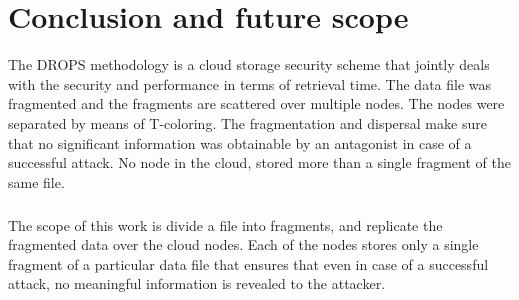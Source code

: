 
\chapter{Conclusion and future scope}

The DROPS methodology is a cloud storage security scheme that jointly deals with the security and performance in terms of retrieval time. The data file was fragmented and the fragments are scattered over multiple nodes. The nodes were separated by means of T-coloring. The fragmentation and dispersal make sure that no significant information was obtainable by an antagonist in case of a successful attack. No node in the cloud, stored more than a single fragment of the same file.

\paragraph{}
The scope of this work is divide a file into fragments, and replicate the fragmented data over the cloud nodes. Each of the nodes stores only a single fragment of a particular data file that ensures that even in case of a successful attack, no meaningful information is revealed to the attacker.

